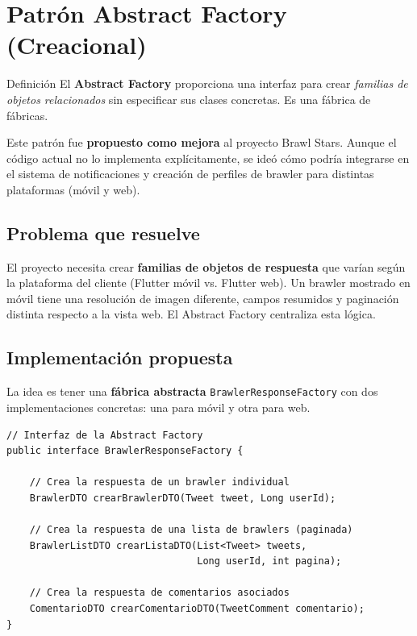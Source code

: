 \documentclass[12pt,a4paper]{article}
\begin{document}
\newpage
\section{Patr\'on Abstract Factory (Creacional)}

\begin{patronbox}{Definici\'on}
El \textbf{Abstract Factory} proporciona una interfaz para crear \textit{familias de objetos relacionados} sin especificar sus clases concretas. Es una f\'abrica de f\'abricas.
\end{patronbox}

\begin{tcolorbox}[colback=bsYellow!15, colframe=bsYellow!80!black, arc=3pt, title={\textbf{Nota de implementaci\'on}}, coltitle=black, fonttitle=\bfseries]
Este patr\'on fue \textbf{propuesto como mejora} al proyecto Brawl Stars. Aunque el c\'odigo actual no lo implementa expl\'icitamente, se ide\'o c\'omo podr\'ia integrarse en el sistema de notificaciones y creaci\'on de perfiles de brawler para distintas plataformas (m\'ovil y web).
\end{tcolorbox}

\subsection{Problema que resuelve}

El proyecto necesita crear \textbf{familias de objetos de respuesta} que var\'ian seg\'un la plataforma del cliente (Flutter m\'ovil vs. Flutter web). Un brawler mostrado en m\'ovil tiene una resoluci\'on de imagen diferente, campos resumidos y paginaci\'on distinta respecto a la vista web. El Abstract Factory centraliza esta l\'ogica.

\subsection{Implementaci\'on propuesta}

La idea es tener una \textbf{f\'abrica abstracta} \texttt{BrawlerResponseFactory} con dos implementaciones concretas: una para m\'ovil y otra para web.

\begin{lstlisting}[caption={BrawlerResponseFactory.java -- Interfaz de la Abstract Factory}]
// Interfaz de la Abstract Factory
public interface BrawlerResponseFactory {

    // Crea la respuesta de un brawler individual
    BrawlerDTO crearBrawlerDTO(Tweet tweet, Long userId);

    // Crea la respuesta de una lista de brawlers (paginada)
    BrawlerListDTO crearListaDTO(List<Tweet> tweets,
                                 Long userId, int pagina);

    // Crea la respuesta de comentarios asociados
    ComentarioDTO crearComentarioDTO(TweetComment comentario);
}
\end{lstlisting}
\end{document}
